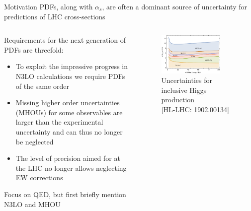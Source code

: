 \documentclass[aspectratio=169, 8pt,t]{beamer}
\begin{document}
\begin{frame}{Motivation}
  PDFs, along with $\alpha_s$, are often a dominant source of uncertainty for predictions of LHC cross-sections
  \begin{columns}
    \begin{column}{0.49\textwidth}
      \vspace*{1em}

      Requirements for the next generation of PDFs are threefold:
      \begin{itemize}
        \item To exploit the impressive progress in N3LO calculations we require PDFs of the same order
        \item Missing higher order uncertainties (MHOUs) for some observables are larger than the experimental uncertainty and can thus no longer be neglected
        \item The level of precision aimed for at the LHC no longer allows neglecting EW corrections
      \end{itemize}

      \vspace*{1em}
      Focus on QED, but first briefly mention N3LO and MHOU
    \end{column}

    \begin{column}{0.49\textwidth}
      \begin{figure}
        \includegraphics[width=0.8\textwidth]{figures/sources_of_unceratinty.pdf}
        \caption*{Uncertainties for inclusive Higgs production \\
        \color{gray}\small [HL-LHC: 1902.00134]}
      \end{figure}
    \end{column}
  \end{columns}
\end{frame}
\end{document}

